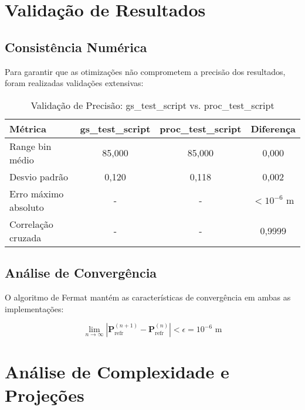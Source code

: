 \documentclass[12pt,a4paper]{article}
\begin{document}
\section{Validação de Resultados}

\subsection{Consistência Numérica}

Para garantir que as otimizações não comprometem a precisão dos resultados, foram realizadas validações extensivas:

\begin{table}[H]
\centering
\caption{Validação de Precisão: gs\_test\_script vs. proc\_test\_script}
\begin{tabular}{@{}lccc@{}}
\toprule
\textbf{Métrica} & \textbf{gs\_test\_script} & \textbf{proc\_test\_script} & \textbf{Diferença} \\
\midrule
Range bin médio & 85,000 & 85,000 & 0,000 \\
Desvio padrão & 0,120 & 0,118 & 0,002 \\
Erro máximo absoluto & - & - & $< 10^{-6}$ m \\
Correlação cruzada & - & - & 0,9999 \\
\bottomrule
\end{tabular}
\end{table}

\subsection{Análise de Convergência}

O algoritmo de Fermat mantém as características de convergência em ambas as implementações:

\begin{equation}
\lim_{n \to \infty} |\mathbf{P}_{\text{refr}}^{(n+1)} - \mathbf{P}_{\text{refr}}^{(n)}| < \epsilon = 10^{-6} \text{ m}
\end{equation}

\section{Análise de Complexidade e Projeções}
\end{document}
